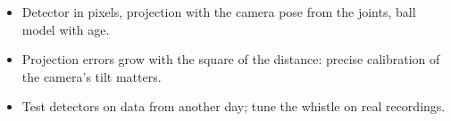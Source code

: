 \begin{keyidea}
\begin{itemize}[nosep]
  \item Detector in pixels, projection with the camera pose from the joints, ball model with age.
  \item Projection errors grow with the square of the distance: precise calibration of the camera's tilt matters.
  \item Test detectors on data from another day; tune the whistle on real recordings.
\end{itemize}
\end{keyidea}
